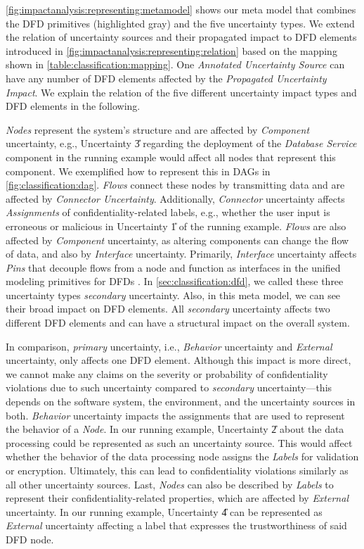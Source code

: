 \autoref{fig:impactanalysis:representing:metamodel} shows our meta model that combines the \ac{DFD} primitives (highlighted gray) and the five uncertainty types.
We extend the relation of uncertainty sources and their propagated impact to \ac{DFD} elements introduced in \autoref{fig:impactanalysis:representing:relation} based on the mapping shown in \autoref{table:classification:mapping}.
One \emph{Annotated Uncertainty Source} can have any number of \ac{DFD} elements affected by the \emph{Propagated Uncertainty Impact}.
We explain the relation of the five different uncertainty impact types and \ac{DFD} elements in the following.

\emph{Nodes} represent the system's structure and are affected by \emph{Component} uncertainty, e.g., Uncertainty \U{3} regarding the deployment of the \emph{Database Service} component in the running example would affect all nodes that represent this component.
We exemplified how to represent this in \acp{DAG} in \autoref{fig:classification:dag}.
\emph{Flows} connect these nodes by transmitting data and are affected by \emph{Connector Uncertainty}.
Additionally, \emph{Connector} uncertainty affects \emph{Assignments} of confidentiality-related labels, e.g., whether the user input is erroneous or malicious in Uncertainty \U{1} of the running example.
\emph{Flows} are also affected by \emph{Component} uncertainty, as altering components can change the flow of data, and also by \emph{Interface} uncertainty.
Primarily, \emph{Interface} uncertainty affects \emph{Pins} that decouple flows from a node and function as interfaces in the unified modeling primitives for \acp{DFD} \cite{seifermann_unified_2021}.
In \autoref{sec:classification:dfd}, we called these three uncertainty types \emph{secondary} uncertainty.
Also, in this meta model, we can see their broad impact on \ac{DFD} elements.
All \emph{secondary} uncertainty affects two different \ac{DFD} elements and can have a structural impact on the overall system.

In comparison, \emph{primary} uncertainty, i.e., \emph{Behavior} uncertainty and \emph{External} uncertainty, only affects one \ac{DFD} element.
Although this impact is more direct, we cannot make any claims on the severity or probability of confidentiality violations due to such uncertainty compared to \emph{secondary} uncertainty---this depends on the software system, the environment, and the uncertainty sources in both.
\emph{Behavior} uncertainty impacts the assignments that are used to represent the behavior of a \emph{Node}.
In our running example, Uncertainty \U{2} about the data processing could be represented as such an uncertainty source.
This would affect whether the behavior of the data processing node assigns the \emph{Labels} for validation or encryption.
Ultimately, this can lead to confidentiality violations similarly as all other uncertainty sources.
Last, \emph{Nodes} can also be described by \emph{Labels} to represent their confidentiality-related properties, which are affected by \emph{External} uncertainty.
In our running example, Uncertainty \U{4} can be represented as \emph{External} uncertainty affecting a label that expresses the trustworthiness of said \ac{DFD} node.

